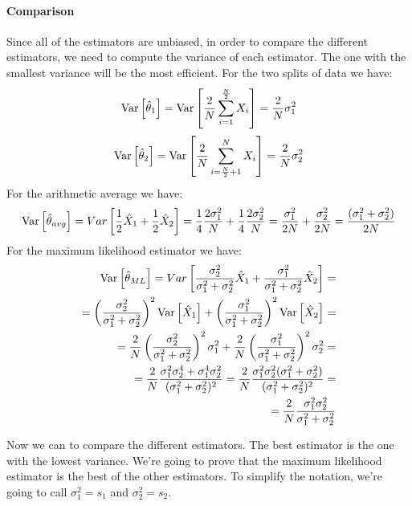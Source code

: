 \paragraph*{Comparison}
Since all of the estimators are unbiased, in order to compare the different estimators, we need to compute the variance of each estimator. The one with the smallest variance will be the most efficient. For the two splits of data we have:
\[
    \text{Var}\left[\hat \theta_1\right] = \text{Var}\left[\frac{2}{N} \sum_{i=1}^{\frac{N}{2}} X_i\right] = \frac{2}{N}\sigma_1^2
\]
\[
    \text{Var}\left[\hat \theta_2\right] = \text{Var}\left[\frac{2}{N} \sum_{i=\frac{N}{2} + 1}^{N} X_i\right] = \frac{2}{N}\sigma_2^2
\]
For the arithmetic average we have:
\[
    \text{Var}\left[\hat \theta_{avg}\right]=Var\left[\frac 12\hat X_1+\frac 12 \hat X_2\right]=\frac 14\frac{2\sigma_1^2}N+\frac 14 \frac{2\sigma_2^2}N=\frac{\sigma_1^2}{2N}+\frac{\sigma_2^2}{2N}= \frac{(\sigma_1^2+\sigma^2_2)}{2N}
\]
For the maximum likelihood estimator we have:
\begin{align*}
    \text{Var}\left[\hat{\theta}_{ML}\right] = Var\left[\frac{\sigma_2^2}{\sigma_1^2+\sigma_2^2}\hat X_1+\frac{\sigma_1^2}{\sigma_1^2+\sigma_2^2}\hat X_2\right]=                                            \\
    = \left(\frac{\sigma_2^2}{\sigma_1^2+\sigma_2^2}\right)^2 \text{Var}\left[\hat X_1\right]+\left(\frac{\sigma_1^2}{\sigma_1^2+\sigma_2^2}\right)^2 \text{Var}\left[\hat X_2\right] =                                       \\
    = \frac{2}{N} \left(\frac{\sigma_2^2}{\sigma_1^2+\sigma_2^2}\right)^2 \sigma_1^2 + \frac{2}{N} \left(\frac{\sigma_1^2}{\sigma_1^2+\sigma_2^2}\right)^2 \sigma_2^2 =                     \\
    = \frac{2}{N} \frac{\sigma_1^2\sigma_2^4+\sigma_1^4\sigma_2^2}{(\sigma_1^2+\sigma_2^2)^2} = \frac{2}{N} \frac{\sigma_1^2\sigma_2^2(\sigma_1^2+\sigma_2^2)}{(\sigma_1^2+\sigma_2^2)^2} = \\
    = \frac{2}{N} \frac{\sigma_1^2\sigma_2^2}{\sigma_1^2+\sigma_2^2}
\end{align*}

Now we can to compare the different estimators. The best estimator is the one with the lowest variance. We're going to prove that the maximum likelihood estimator is the best of the other estimators. To simplify the notation, we're going to call $\sigma_1^2 = s_1$ and $\sigma_2^2 = s_2$.

